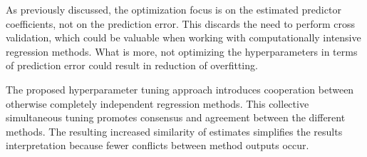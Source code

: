 As previously discussed, the optimization focus is on the estimated predictor coefficients, not on the prediction error. This discards the need to perform cross validation, which could be valuable when working with computationally intensive regression methods. What is more, not optimizing the hyperparameters in terms of prediction error could result in reduction of overfitting.

The proposed hyperparameter tuning approach introduces cooperation between otherwise completely independent regression methods. This collective simultaneous tuning promotes consensus and agreement between the different methods. The resulting increased similarity of estimates simplifies the results interpretation because fewer conflicts between method outputs occur. 
